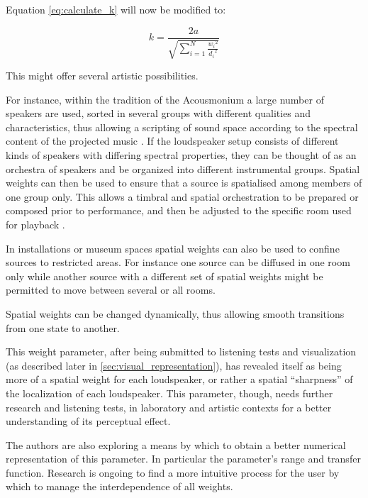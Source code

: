 \documentclass[twoside,10pt]{article}
\begin{document}
Equation \ref{eq:calculate_k} will now be modified to:

\begin{equation} \label{eq:calculate_k_weighted}
k = \frac{2a}{\sqrt{\sum_{i=1}^{N} \frac{{w_{i}}^2}{{d_{i}}^2}}}
\end{equation}

This might offer several artistic possibilities. 

For instance, within the tradition of the Acousmonium \cite{Bayle:1993MusiqueAcousmatique} a large number of speakers are used, sorted in several groups with different qualities and characteristics, thus allowing a scripting of sound space according to the spectral content of the projected music \cite{Prager:2002acousmatique}. If the loudspeaker setup consists of different kinds of speakers with differing spectral properties, they can be thought of as an orchestra of speakers and be organized into different instrumental groups. Spatial weights can then be used to ensure that a source is spatialised among members of one group only. This allows a timbral and spatial orchestration to be prepared or composed prior to performance, and then be adjusted to the specific room used for playback \cite{Lyon:2008spatial_orchestration}. 

In installations or museum spaces spatial weights can also be used to confine sources to restricted areas. For instance one source can be diffused in one room only while another source with a different set of spatial weights might be permitted to move between several or all rooms.

Spatial weights can be changed dynamically, thus allowing smooth transitions from one state to another. 

This weight parameter, after being submitted to listening tests and visualization (as described later in \ref{sec:visual_representation}), has revealed itself as being more of a spatial weight for each loudspeaker, or rather a spatial ``sharpness'' of the localization of each loudspeaker. This parameter, though, needs further research and listening tests, in laboratory and artistic contexts for a better understanding of its perceptual effect.

The authors are also exploring a means by which to obtain a better numerical representation of this parameter.  In particular the parameter's range and transfer function. Research is ongoing to find a more intuitive process for the user by which to manage the interdependence of all weights.
\end{document}
